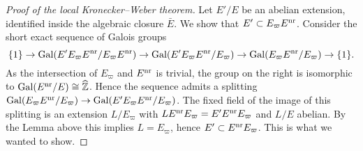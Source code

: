 \documentclass[../main.tex]{subfiles}
\begin{document}
\begin{proof}[Proof of the local Kronecker--Weber theorem]
  Let $E'/E$ be an abelian extension, identified inside the 
  algebraic closure $\bar E$. We show that $E' \subset E_\varpi E^{\mathrm{nr}}$. 
  Consider the short exact sequence of Galois groups
  \begin{equation*}
    \{1\} \to \operatorname{Gal}(E' E_\varpi E^{\mathrm{nr}}/ E_\varpi E^{\mathrm{nr}}) \to 
    \operatorname{Gal}(E' E_\varpi E^{\mathrm{nr}}/ E_\varpi) \to 
    \operatorname{Gal}(E_\varpi E^{\mathrm{nr}}/ E_\varpi) \to  \{1\}.
  \end{equation*}
  As the intersection of  $E_\varpi$ and $E^{\mathrm{nr}}$ is trivial, the group on the right
  is isomorphic to $\operatorname{Gal}(E^{\mathrm{nr}} /E) \cong \widehat {\mathbb{Z}}$. Hence the sequence admits 
  a splitting $\operatorname{Gal}(E_\varpi E^{\mathrm{nr}}/ E_\varpi) \to \operatorname{Gal}(E' E_\varpi E^{\mathrm{nr}}/
  E_\varpi)$. The fixed field of the image of this splitting is an extension
  $L/E_\varpi$ with $L E^{\mathrm{nr}} E_\varpi = E' E^{\mathrm{nr}} E_\varpi$ and $L/E$ abelian.
  By the Lemma above this implies $L = E_\varpi$, hence $E' \subset E^{\mathrm{nr}} E_\varpi$.
  This is what we wanted to show.
\end{proof}


\end{document}
